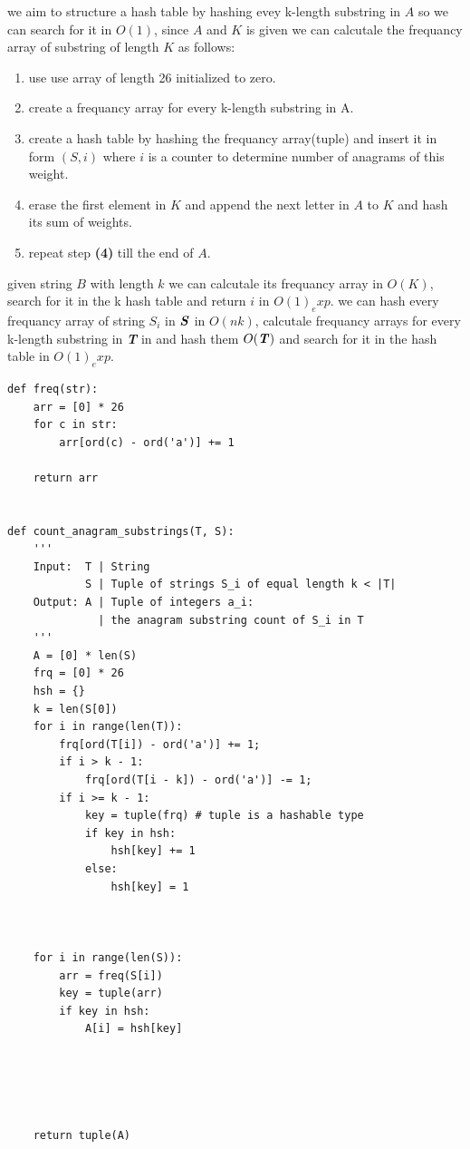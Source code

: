 \documentclass[12pt,twoside]{article}
\begin{document}
\begin{problems}
\begin{problemparts}
\problempart %
  we aim to structure a hash table by hashing evey k-length substring in $A$ so we can search for it in $O(1)$, 
  since $A$ and $K$ is given we can calcutale the frequancy array of substring of length $K$ as follows: 
  \begin{enumerate}
    \item use use array of length 26 initialized to zero.
    \item create a frequancy array for every k-length substring in A.
    \item create a hash table by hashing the frequancy array(tuple) and insert it in form $(S, i)$ where $i$ is a counter
      to determine number of anagrams of this weight.
    \item erase the first element in $K$ and append the next letter in $A$ to $K$ and hash its sum of weights. 
    \item repeat step \textbf{(4)} till the end of $A$.
  \end{enumerate}
  given string $B$ with length $k$ we can calcutale its frequancy array in $O(K)$, search for it in the 
  k hash table and return $i$ in $O(1)_exp$.
\problempart %
  we can hash every frequancy array of string $S_i$ in $\textbf{\textit{S}}$ in $O(nk)$, calcutale frequancy arrays for every k-length substring in \textbf{\textit{T}}
  in and hash them $O(\textbf{\textit{T}})$ and search for it in the hash table in $O(1)_exp$.
  \newpage
\problempart 
\begin{lstlisting}
def freq(str):
    arr = [0] * 26
    for c in str:
        arr[ord(c) - ord('a')] += 1
    
    return arr


def count_anagram_substrings(T, S):
    '''
    Input:  T | String
            S | Tuple of strings S_i of equal length k < |T|
    Output: A | Tuple of integers a_i:
              | the anagram substring count of S_i in T
    '''
    A = [0] * len(S) 
    frq = [0] * 26
    hsh = {}
    k = len(S[0])
    for i in range(len(T)):
        frq[ord(T[i]) - ord('a')] += 1;
        if i > k - 1:
            frq[ord(T[i - k]) - ord('a')] -= 1;
        if i >= k - 1:
            key = tuple(frq) # tuple is a hashable type
            if key in hsh:
                hsh[key] += 1 
            else:
                hsh[key] = 1 

    
        
    for i in range(len(S)):
        arr = freq(S[i])
        key = tuple(arr)
        if key in hsh:
            A[i] = hsh[key]


                
    

    return tuple(A)

\end{lstlisting}
\end{problemparts}

\end{problems}
\end{document}
